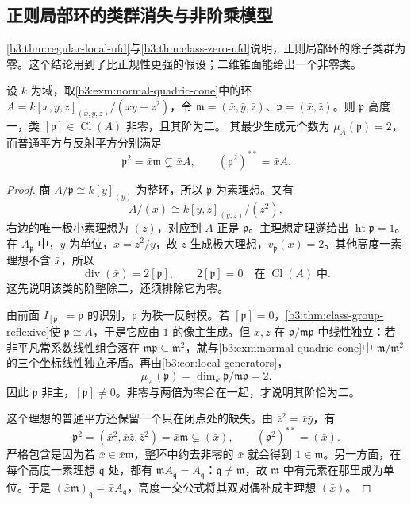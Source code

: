 \subsection{正则局部环的类群消失与非阶乘模型}
\label{b3:subsec:2005:03}

\cref{b3:thm:regular-local-ufd}与\cref{b3:thm:class-zero-ufd}说明，正则局部环的除子类群为零。这个结论用到了比正规性更强的假设；二维锥面能给出一个非零类。

\begin{example}\label{b3:exm:quadric-nonfactorial-class}
	设 \(k\) 为域，取\cref{b3:exm:normal-quadric-cone}中的环 \(A=k[x,y,z]_{(x,y,z)}/(xy-z^2)\)，令 \(\mathfrak m=(\bar x,\bar y,\bar z)\)、\(\mathfrak p=(\bar x,\bar z)\)。则 \(\mathfrak p\) 高度一，类 \([\mathfrak p]\in\operatorname{Cl}(A)\) 非零，且其阶为二。 其最少生成元个数为 \(\mu_A(\mathfrak p)=2\)，而普通平方与反射平方分别满足
	\[
		\mathfrak p^2=\bar x\mathfrak m\subsetneq\bar xA, \qquad(\mathfrak p^2)^{**}=\bar xA.
	\]
\end{example}
\begin{proof}
	商 \(A/\mathfrak p\cong k[y]_{(y)}\) 为整环，所以 \(\mathfrak p\) 为素理想。又有
	\[
		A/(\bar x)\cong k[y,z]_{(y,z)}/(z^2),
	\]
	右边的唯一极小素理想为 \((\bar z)\)，对应到 \(A\) 正是 \(\mathfrak p\)。主理想定理遂给出 \(\operatorname{ht}\mathfrak p=1\)。在 \(A_{\mathfrak p}\) 中，\(\bar y\) 为单位，\(\bar x=\bar z^2/\bar y\)，故 \(\bar z\) 生成极大理想，\(v_{\mathfrak p}(\bar x)=2\)。其他高度一素理想不含 \(\bar x\)，所以
	\[
		\operatorname{div}(\bar x)=2[\mathfrak p], \qquad 2[\mathfrak p]=0\quad\text{在}\;\operatorname{Cl}(A)\;\text{中}.
	\]
	这先说明该类的阶整除二，还须排除它为零。

	由前面 \(I_{[\mathfrak p]}=\mathfrak p\) 的识别，\(\mathfrak p\) 为秩一反射模。若 \([\mathfrak p]=0\)，\cref{b3:thm:class-group-reflexive}使 \(\mathfrak p\cong A\)，于是它应由 \(1\) 的像主生成。但 \(\bar x,\bar z\) 在 \(\mathfrak p/\mathfrak m\mathfrak p\) 中线性独立：若非平凡常系数线性组合落在 \(\mathfrak m\mathfrak p\subseteq\mathfrak m^2\)，就与\cref{b3:exm:normal-quadric-cone}中 \(\mathfrak m/\mathfrak m^2\) 的三个坐标线性独立矛盾。再由\cref{b3:cor:local-generators}，
	\[
		\mu_A(\mathfrak p)=\dim_k\mathfrak p/\mathfrak m\mathfrak p=2.
	\]
	因此 \(\mathfrak p\) 非主，\([\mathfrak p]\ne0\)。非零与两倍为零合在一起，才说明其阶恰为二。

	这个理想的普通平方还保留一个只在闭点处的缺失。由 \(\bar z^2=\bar x\bar y\)，有
	\[
		\mathfrak p^2=(\bar x^2,\bar x\bar z,\bar z^2) =\bar x\mathfrak m\subsetneq(\bar x), \qquad (\mathfrak p^2)^{**}=(\bar x).
	\]
	严格包含是因为若 \(\bar x\in\bar x\mathfrak m\)，整环中约去非零的 \(\bar x\) 就会得到 \(1\in\mathfrak m\)。另一方面，在每个高度一素理想 \(\mathfrak q\) 处，都有 \(\mathfrak mA_{\mathfrak q}=A_{\mathfrak q}\)：\(\mathfrak q\ne\mathfrak m\)，故 \(\mathfrak m\) 中有元素在那里成为单位。于是 \((\bar x\mathfrak m)_{\mathfrak q}=\bar xA_{\mathfrak q}\)，高度一交公式将其双对偶补成主理想 \((\bar x)\)。
\end{proof}

